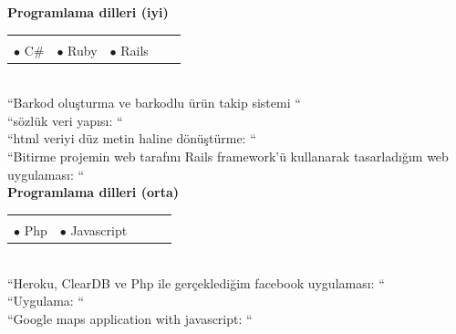 \documentclass[10pt,a4paper]{article}
\begin{document}
{\bf Programlama dilleri (iyi)}\\
\hspace*{0.3in}\begin{tabular}{lrrrr}
\vspace{0.5 mm}\\
  $\bullet$ C$ \# $ &$\bullet$ Ruby &$\bullet$ Rails & &\\
\end{tabular}
\vspace{0.5 mm}\\
\hspace*{0.6in}\footnotesize{``Barkod oluşturma ve barkodlu ürün takip sistemi ``}\\
\hspace*{0.6in}\footnotesize{``sözlük veri yapısı: ``}\\
\hspace*{0.6in}\footnotesize{``html veriyi düz metin haline dönüştürme: ``}\\
\hspace*{0.6in}\footnotesize{``Bitirme projemin web tarafını Rails framework'ü kullanarak tasarladığım web uygulaması: ``}\\

{\bf Programlama dilleri (orta)}\\
\hspace*{0.3in}\begin{tabular}{lrrrr}
\vspace{0.5 mm}\\
  $\bullet$ Php &$\bullet$ Javascript & & &\\
\end{tabular}
\vspace{0.5 mm}\\
\hspace*{0.6in}\footnotesize{``Heroku, ClearDB ve Php ile gerçeklediğim facebook uygulaması: ``}\\
\hspace*{0.6in}\footnotesize{``Uygulama: ``}\\
\hspace*{0.6in}\footnotesize{``Google maps application with javascript: ``}\\
\end{document}
